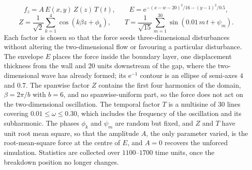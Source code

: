 \documentclass[lineno]{jfm}
\begin{document}
\begin{equation}\label{eq:seedForcing}
	f_z = A\,E(x,y)\,Z(z)\,T(t),\qquad
	E = \mathrm{e}^{-{(x-w-20)}^2/16-{(y-1)}^2/0.5},
\end{equation}
\begin{equation}\label{eq:seedFactors}
	Z = \frac{1}{\sqrt{2}}\sum_{k=1}^{4}\cos\!\left(k\beta z+\phi_k\right),\qquad
	T = \frac{1}{\sqrt{15}}\sum_{m=1}^{30}\sin\!\left(0.01\,m\,t+\psi_m\right).
\end{equation}
Each factor is chosen so that the force seeds three-dimensional disturbances without altering the two-dimensional flow or favouring a particular disturbance. The envelope $E$ places the force inside the boundary layer, one displacement thickness from the wall and $20$ units downstream of the gap, where the two-dimensional wave has already formed; its $\mathrm{e}^{-1}$ contour is an ellipse of semi-axes $4$ and $0.7$. The spanwise factor $Z$ contains the first four harmonics of the domain, $\beta=2\pi/b$ with $b=6$, and no spanwise-uniform part, so the force does not act on the two-dimensional oscillation. The temporal factor $T$ is a multisine of $30$ lines covering $0.01\leq\omega\leq0.30$, which includes the frequency of the oscillation and its subharmonic. The phases $\phi_k$ and $\psi_m$ are random but fixed, and $Z$ and $T$ have unit root mean square, so that the amplitude $A$, the only parameter varied, is the root-mean-square force at the centre of $E$, and $A=0$ recovers the unforced simulation. Statistics are collected over $1100$--$1700$ time units, once the breakdown position no longer changes.
\end{document}
